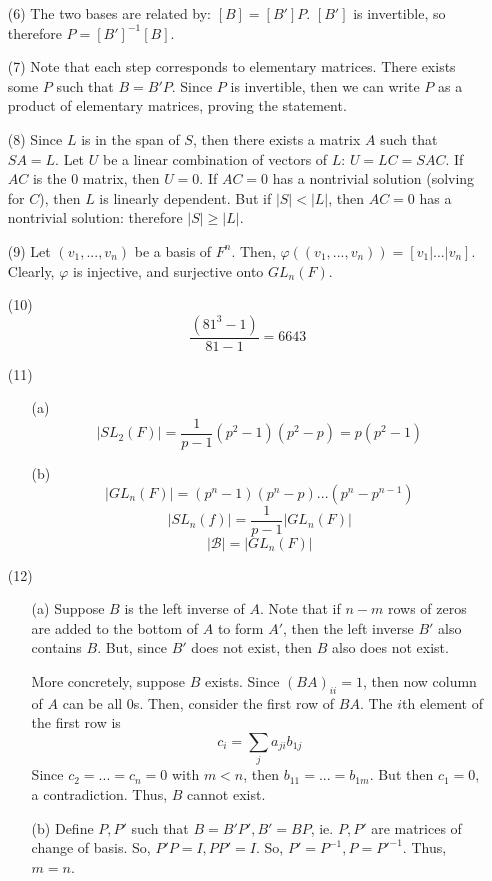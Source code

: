 \begin{itemize}
\begin{itemize}
\end{itemize}
\item[(6)]
The two bases are related by: $[B] = [B']P$. $[B']$ is invertible, so therefore $P = [B']^{-1}[B]$.
\item[(7)]
Note that each step corresponds to elementary matrices. There exists some $P$ such that $B = B'P$. Since $P$ is invertible, then we can write $P$ as a product of elementary matrices, proving the statement.
\item[(8)]
Since $L$ is in the span of $S$, then there exists a matrix $A$ such that $SA = L$. Let $U$ be a linear combination of vectors of $L$: $U = LC = SAC$. If $AC$ is the 0 matrix, then $U = 0$. If $AC = 0$ has a nontrivial solution (solving for $C$), then $L$ is linearly dependent. But if $|S| < |L|$, then $AC = 0$ has a nontrivial solution: therefore $|S| \geq |L|$.
\item[(9)]
Let $(v_1, ..., v_n)$ be a basis of $F^n$. Then, $\varphi((v_1, ..., v_n)) = [v_1 | ... | v_n]$. Clearly, $\varphi$ is injective, and surjective onto $GL_n(F)$.
\item[(10)]
$$\frac{(81^3 - 1)}{81 - 1} = 6643$$
\item[(11)]
\begin{itemize}
\item[(a)]
$$|SL_2(F)| = \frac{1}{p - 1}(p^2 - 1)(p^2 - p) = p(p^2 - 1)$$
\item[(b)]
$$|GL_n(F)| = (p^n - 1)(p^n - p)...(p^n - p^{n - 1})$$
$$|SL_n(f)| = \frac{1}{p - 1}|GL_n(F)|$$
$$|\mathcal{B}| = |GL_n(F)|$$
\end{itemize}
\item[(12)]
\begin{itemize}
\item[(a)]
Suppose $B$ is the left inverse of $A$. Note that if $n - m$ rows of zeros are added to the bottom of $A$ to form $A'$, then the left inverse $B'$ also contains $B$. But, since $B'$ does not exist, then $B$ also does not exist.

More concretely, suppose $B$ exists. Since $(BA)_{ii} = 1$, then now column of $A$ can be all 0s. Then, consider the first row of $BA$. The $i$th element of the first row is 
$$c_i = \sum_{j} a_{ji}b_{1j}$$
Since $c_2 = ... = c_n = 0$ with $m < n$, then $b_{11} = ... = b_{1m}$. But then $c_1 = 0$, a contradiction. Thus, $B$ cannot exist.
\item[(b)]
Define $P, P'$ such that $B = B'P', B' = BP$, ie. $P, P'$ are matrices of change of basis. So, $P'P = I, PP' = I$. So, $P' = P^{-1}, P = P'^{-1}$. Thus, $m = n$.
\end{itemize}
\end{itemize}
%